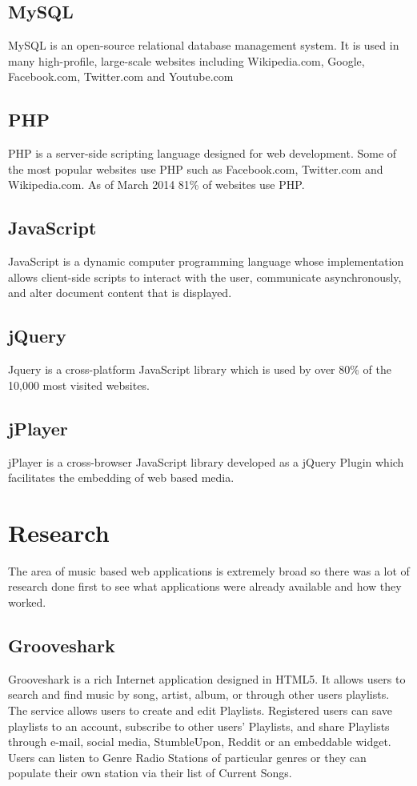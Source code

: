 \documentclass[a4paper, 12pt]{report}
\begin{document}
\subsection{MySQL}
MySQL is an open-source relational database management system. It is used in many high-profile, large-scale websites including Wikipedia.com, Google, Facebook.com, Twitter.com and Youtube.com\cite{MySQL}

\subsection{PHP}
PHP is a server-side scripting language designed for web development. Some of the most popular websites use PHP such as Facebook.com, Twitter.com and Wikipedia.com. As of March 2014 81\% of websites use PHP\cite{php}. 

\subsection{JavaScript}
JavaScript is a dynamic computer programming language whose implementation allows client-side scripts to interact with the user, communicate asynchronously, and alter document content that is displayed\cite{javascript}.

\subsection{jQuery}
Jquery is a cross-platform JavaScript library which is used by over 80\% of the 10,000 most visited websites\cite{jquery}.

\subsection{jPlayer}
jPlayer is a cross-browser JavaScript library developed as a jQuery Plugin which facilitates the embedding of web based media\cite{jplayer}.

\section{Research}
The area of music based web applications is extremely broad so there was a lot of research done first to see what applications were already available and how they worked.

\subsection{Grooveshark}
Grooveshark\cite{grooveshark} is a rich Internet application designed in HTML5. It allows users to search and find music by song, artist, album, or through other users playlists. The service allows users to create and edit Playlists. Registered users can save playlists to an account, subscribe to other users’ Playlists, and share Playlists through e-mail, social media, StumbleUpon, Reddit or an embeddable widget. Users can listen to Genre Radio Stations of particular genres or they can populate their own station via their list of Current Songs. \\
\end{document}
